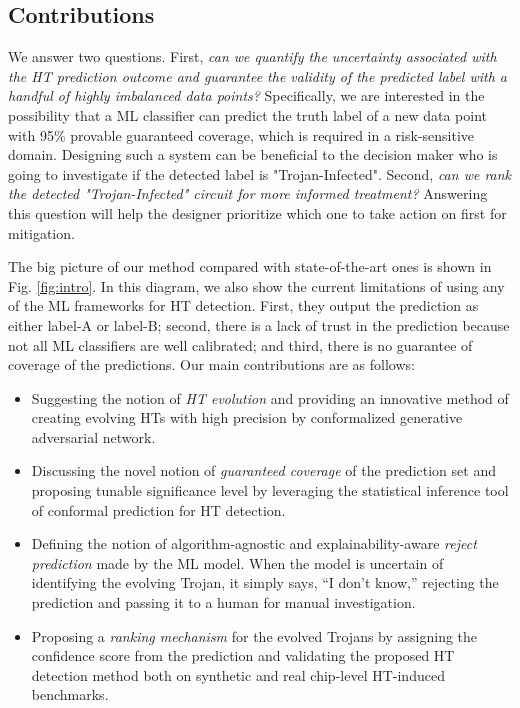 \iffalse 
\subsection*{Contributions}
\label{Contribution}
We answer two questions. First, \textit{can we quantify the uncertainty associated with the HT prediction outcome and guarantee the validity of the predicted label with a handful of highly imbalanced data points?} Specifically, we are interested in the possibility that a ML classifier can predict the truth label of a new data point with 95\% provable guaranteed coverage, which is required in a risk-sensitive domain. Designing such a system can be beneficial to the decision maker who is going to investigate if the detected label is "Trojan-Infected". Second, \textit{can we rank the detected "Trojan-Infected" circuit for more informed treatment?} Answering this question will help the designer prioritize which one to take action on first for mitigation.

The big picture of our method compared with state-of-the-art ones is shown in Fig. \ref{fig:intro}. In this diagram, we also show the current limitations of using any of the ML frameworks for HT detection. First, they output the prediction as either label-A or label-B; second, there is a lack of trust in the prediction because not all ML classifiers are well calibrated; and third, there is no guarantee of coverage of the predictions. Our main contributions are as follows:

\begin{itemize}
\item Suggesting the notion of \textit{HT evolution} and providing an innovative method of creating evolving HTs with high precision by conformalized generative adversarial network.
\item Discussing the novel notion of \textit{guaranteed coverage} of the prediction set and proposing tunable significance level by leveraging the statistical inference tool of conformal prediction for HT detection.
\item Defining the notion of algorithm-agnostic and explainability-aware \textit{reject prediction} made by the ML model. When the model is uncertain of identifying the evolving Trojan, it simply says, ``I don't know,'' rejecting the prediction and passing it to a human for manual investigation.
\item Proposing a \textit{ranking mechanism} for the evolved Trojans by assigning the confidence score from the prediction and validating the proposed HT detection method both on synthetic and real chip-level HT-induced benchmarks.
\end{itemize}

